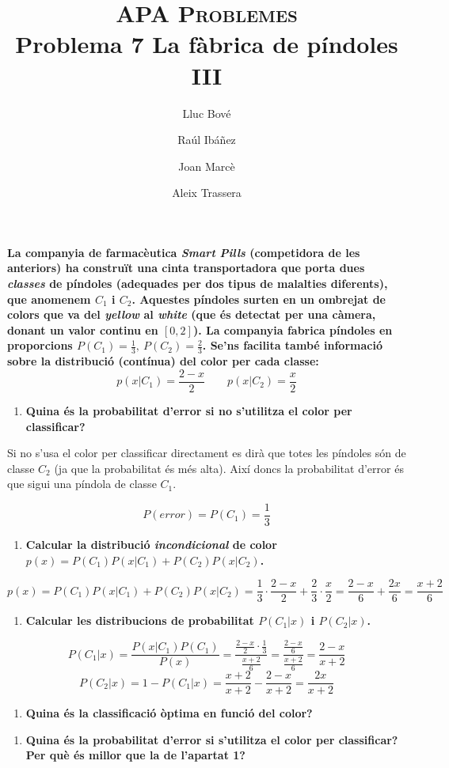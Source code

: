 \documentclass[a4paper]{article}
\title{\textsc{APA Problemes} \\ Problema 7 La fàbrica de píndoles III}
\author{Lluc Bové \and Raúl Ibáñez \and Joan Marcè \and Aleix Trassera}
\date{}
\begin{document}
\maketitle

\textbf{La companyia de farmacèutica \emph{Smart Pills} (competidora de les anteriors) ha construït una cinta transportadora que porta dues \emph{classes} de píndoles (adequades per dos tipus de malalties diferents), que anomenem $C_1$ i $C_2$. Aquestes píndoles surten en un ombrejat de colors que va del \emph{yellow} al \emph{white} (que és detectat per una càmera, donant un valor continu en $[0,2]$). La companyia fabrica píndoles en proporcions $P(C_1) = \frac{1}{3},\ P(C_2) = \frac{2}{3}$. Se'ns facilita també informació sobre la distribució (contínua) del color per cada classe: }
$$
p(x|C_1) = \frac{2 - x}{2} \qquad p(x|C_2) = \frac{x}{2}
$$

\begin{enumerate}
	\item \textbf{Quina és la probabilitat d'error si no s'utilitza el color per classificar?}
\end{enumerate}

Si no s'usa el color per classificar directament es dirà que totes les píndoles són de classe $C_2$ (ja que la probabilitat és més alta). Així doncs la probabilitat d'error és que sigui una píndola de classe $C_1$.

$$
P(error) = P(C_1) = \frac{1}{3}
$$

\begin{enumerate}[resume]
	\item \textbf{Calcular la distribució \emph{incondicional} de color $p(x) = P(C_1)P(x|C_1) + P(C_2)P(x|C_2)$.}
\end{enumerate}
$$
p(x) = P(C_1)P(x|C_1) + P(C_2)P(x|C_2) = \frac{1}{3}·\frac{2 - x}{2} + \frac{2}{3}·\frac{x}{2} = \frac{2 - x}{6} + \frac{2x}{6} = \boxed{\frac{x + 2}{6}}
$$

\begin{enumerate}[resume]
	\item \textbf{Calcular les distribucions de probabilitat $P(C_1|x)$ i $P(C_2|x)$.}
\end{enumerate}
$$
P(C_1|x) = \frac{P(x|C_1)P(C_1)}{P(x)} = 
\frac{\frac{2 - x}{2}·\frac{1}{3}}{\frac{x + 2}{6}} =
\frac{\frac{2 - x}{6}}{\frac{x + 2}{6}} = \boxed{\frac{2 - x}{x + 2}}
$$
$$
P(C_2|x) = 1 - P(C_1|x) = \frac{x + 2}{x + 2} - \frac{2 - x}{x + 2} =
\boxed{\frac{2x}{x + 2}}
$$

\begin{enumerate}[resume]
	\item \textbf{Quina és la classificació òptima en funció del color?}
\end{enumerate}

\begin{tikzpicture}
	
\end{tikzpicture}

\begin{enumerate}[resume]
	\item \textbf{Quina és la probabilitat d'error si s'utilitza el color per classificar? Per què és millor que la de l'apartat 1?}
\end{enumerate}
\end{document}
